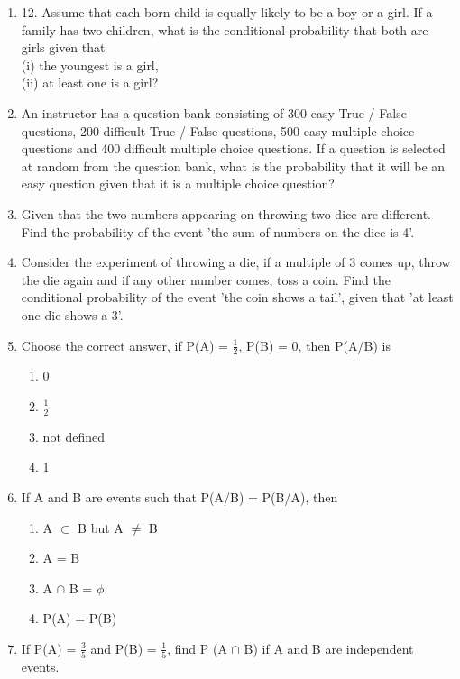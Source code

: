 \begin{enumerate}[label=\arabic*.,ref=\thesubsection.\theenumi]
\item 12. Assume that each born child is equally likely to be a boy or a girl. If a family has two children, what is the conditional probability that both are girls given that\\
(i) the youngest is a girl,\\ 
(ii) at least one is a girl?\\

\item  An instructor has a question bank consisting of 300 easy True / False questions,
200 difficult True / False questions, 500 easy multiple choice questions and 400 difficult multiple choice questions. If a question is selected at random from the question bank, what is the probability that it will be an easy question given that it is a multiple choice question?\\

\item  Given that the two numbers appearing on throwing two dice are different. Find the probability of the event 'the sum of numbers on the dice is 4'.\\

\item Consider the experiment of throwing a die, if a multiple of 3 comes up, throw the die again and if any other number comes, toss a coin. Find the conditional probability of the event 'the coin shows a tail', given that 'at least one die shows a 3'.\\

\item Choose the correct answer, if P(A) = $\frac{1}{2}$, P(B) = 0, then P(A/B) is
\begin{enumerate}
\item 0
\item $\frac{1}{2}$
\item not defined
\item 1
\end{enumerate}

\item If A and B are events such that P(A/B) = P(B/A), then
\begin{enumerate}
\item A $\subset$ B but A $\neq$ B
\item A = B
\item A $\cap$ B = $\phi$
\item P(A) = P(B)
\end{enumerate}

\item If P(A) = $\frac{3}{5}$ and P(B) = $\frac{1}{5}$, find P (A $\cap$ B) if A and B are independent events.\\


\end{enumerate}
